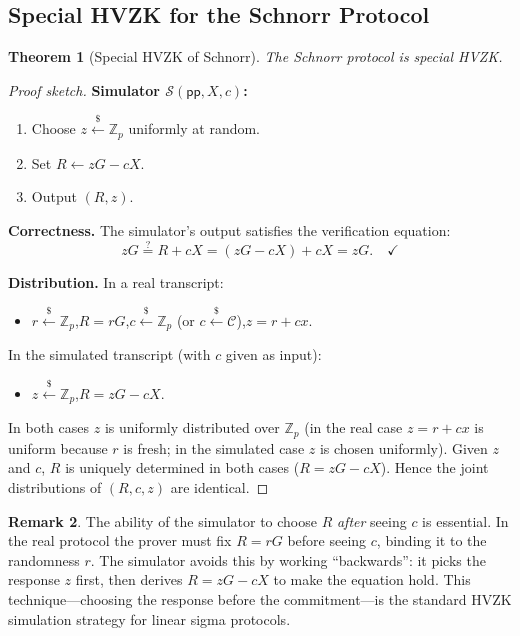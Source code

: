 \documentclass[11pt]{article}
\theoremstyle{plain}
\newtheorem{theorem}{Theorem}[section]
\theoremstyle{definition}
\newtheorem{remark}[theorem]{Remark}
\newcommand{\Z}{\mathbb{Z}}
\newcommand{\samplefrom}{\xleftarrow{\$}}
\newcommand{\Sim}{\mathcal{S}}
\newcommand{\pp}{\mathsf{pp}}
\begin{document}
\subsection{Special HVZK for the Schnorr Protocol}

\begin{theorem}[Special HVZK of Schnorr]
\label{thm:schnorr-hvzk}
The Schnorr protocol is special HVZK.
\end{theorem}

\begin{proof}[Proof sketch]
\textbf{Simulator $\Sim(\pp, X, c)$:}
\begin{enumerate}
  \item Choose $z \samplefrom \Z_p$ uniformly at random.
  \item Set $R \leftarrow zG - cX$.
  \item Output $(R, z)$.
\end{enumerate}

\noindent\textbf{Correctness.}  The simulator's output satisfies the
verification equation:
\[
  zG \stackrel{?}{=} R + cX = (zG - cX) + cX = zG. \quad\checkmark
\]

\noindent\textbf{Distribution.}  In a real transcript:
\begin{itemize}
  \item $r \samplefrom \Z_p$,\quad $R = rG$,\quad $c \samplefrom \Z_p$
        (or $c \samplefrom \mathcal{C}$),\quad $z = r + cx$.
\end{itemize}
In the simulated transcript (with $c$ given as input):
\begin{itemize}
  \item $z \samplefrom \Z_p$,\quad $R = zG - cX$.
\end{itemize}
In both cases $z$ is uniformly distributed over $\Z_p$ (in the real case $z =
r + cx$ is uniform because $r$ is fresh; in the simulated case $z$ is chosen
uniformly).  Given $z$ and $c$, $R$ is uniquely determined in both cases
($R = zG - cX$).  Hence the joint distributions of $(R, c, z)$ are identical.
\end{proof}

\begin{remark}
  The ability of the simulator to choose $R$ \emph{after} seeing $c$ is
  essential.  In the real protocol the prover must fix $R = rG$ before
  seeing $c$, binding it to the randomness $r$.  The simulator avoids this
  by working ``backwards'': it picks the response $z$ first, then derives
  $R = zG - cX$ to make the equation hold.  This technique---choosing the
  response before the commitment---is the standard HVZK simulation strategy
  for linear sigma protocols.
\end{remark}
\end{document}

